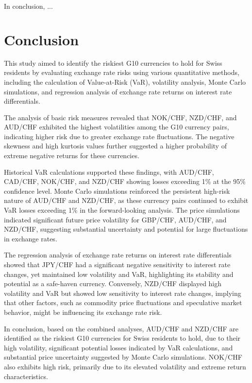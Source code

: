 \documentclass{article}
\begin{document}
In conclusion, ...

\section{Conclusion}

This study aimed to identify the riskiest G10 currencies to hold for Swiss residents by evaluating exchange rate risks using various quantitative methods, including the calculation of Value-at-Risk (VaR), volatility analysis, Monte Carlo simulations, and regression analysis of exchange rate returns on interest rate differentials.

The analysis of basic risk measures revealed that NOK/CHF, NZD/CHF, and AUD/CHF exhibited the highest volatilities among the G10 currency pairs, indicating higher risk due to greater exchange rate fluctuations. The negative skewness and high kurtosis values further suggested a higher probability of extreme negative returns for these currencies.

Historical VaR calculations supported these findings, with AUD/CHF, CAD/CHF, NOK/CHF, and NZD/CHF showing losses exceeding 1\% at the 95\% confidence level. Monte Carlo simulations reinforced the persistent high-risk nature of AUD/CHF and NZD/CHF, as these currency pairs continued to exhibit VaR losses exceeding 1\% in the forward-looking analysis. The price simulations indicated significant future price volatility for GBP/CHF, AUD/CHF, and NZD/CHF, suggesting substantial uncertainty and potential for large fluctuations in exchange rates.

The regression analysis of exchange rate returns on interest rate differentials showed that JPY/CHF had a significant negative sensitivity to interest rate changes, yet maintained low volatility and VaR, highlighting its stability and potential as a safe-haven currency. Conversely, NZD/CHF displayed high volatility and VaR but showed low sensitivity to interest rate changes, implying that other factors, such as commodity price fluctuations and speculative market behavior, might be influencing its exchange rate risk.

In conclusion, based on the combined analyses, AUD/CHF and NZD/CHF are identified as the riskiest G10 currencies for Swiss residents to hold, due to their high volatility, significant potential losses indicated by VaR calculations, and substantial price uncertainty suggested by Monte Carlo simulations. NOK/CHF also exhibits high risk, primarily due to its elevated volatility and extreme return characteristics.
\end{document}
